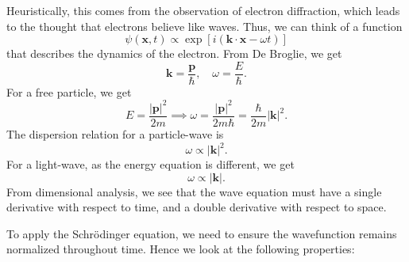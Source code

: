 \documentclass[12pt]{article}
\theoremstyle{definition}
\theoremstyle{remark}
\begin{document}
Heuristically, this comes from the observation of electron diffraction, which leads to the thought that electrons believe like waves. Thus, we can think of a function
\[
	\psi(\mathbf{x}, t) \propto \exp[i(\mathbf{k} \cdot \mathbf{x} - \omega t)]
\]
that describes the dynamics of the electron. From De Broglie, we get
\[
\mathbf{k} = \frac{\mathbf{p}}{\hbar}, \quad \omega = \frac{E}{\hbar}
.\]
For a free particle, we get
\[
E = \frac{|\mathbf{p}|^2}{2m} \implies \omega = \frac{|\mathbf{p}|^2}{2 m \hbar} = \frac{\hbar}{2m} |\mathbf{k}|^2
.\]
The dispersion relation for a particle-wave is
\[
\omega \propto |\mathbf{k}|^2
.\]
For a light-wave, as the energy equation is different, we get
\[
\omega \propto |\mathbf{k}|
.\]
From dimensional analysis, we see that the wave equation must have a single derivative with respect to time, and a double derivative with respect to space.

To apply the Schr\"{o}dinger equation, we need to ensure the wavefunction remains normalized throughout time. Hence we look at the following properties:
\end{document}
